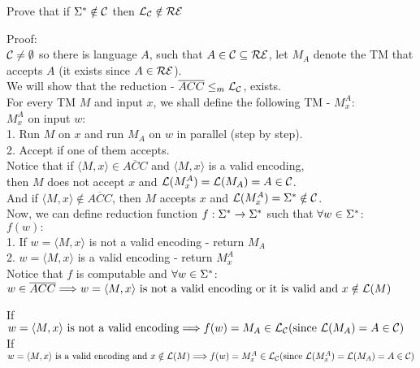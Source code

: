 Prove that if $\Sigma^* \notin \mathcal{C}$ then $\mathcal{L}_{\mathcal{C}} \notin \mathcal{R}\mathcal{E}$

Proof: \\
$\mathcal{C} \neq \emptyset$ so there is language $A$, such that $A \in \mathcal{C} \subseteq \mathcal{R}\mathcal{E}$,
let $M_A$ denote the TM that accepts $A$ (it exists since $A \in \mathcal{R}\mathcal{E}$). \\

We will show that the reduction - $\overline{ACC} \leq_m \mathcal{L}_{\mathcal{C}}$, exists. \\

For every TM $M$ and input $x$, we shall define the following TM - $M_x^A$: \\
$M_x^A$ on input $w$: \\
1. Run $M$ on $x$ and run $M_A$ on $w$ in parallel (step by step). \\
2. Accept if one of them accepts. \\

Notice that if $\langle M, x \rangle \in \overline{ACC}$ and $\langle M, x \rangle$ is a valid encoding, \\
then $M$ does not accept $x$ and $\mathcal{L}(M_x^A) = \mathcal{L}(M_A) = A \in \mathcal{C}$. \\
And if $\langle M, x \rangle \notin \overline{ACC}$,
then $M$ accepts $x$ and $\mathcal{L}(M_x^A) = \Sigma^* \notin \mathcal{C}$. \\

Now, we can define reduction function $f: \Sigma^* \rightarrow \Sigma^*$ such that $\forall w \in \Sigma^*$:\\
$f(w):$ \\
1. If $w = \langle M, x \rangle$ is not a valid encoding - return $M_A$ \\
2. $w = \langle M, x \rangle$ is a valid encoding - return $M_x^A$ \\

Notice that $f$ is computable and $\forall w \in \Sigma^*$: \\
$w \in \overline{ACC} \\
    \Longrightarrow w = \langle M, x \rangle \text{ is not a valid encoding or it is valid and } x \notin \mathcal{L}(M)$

If $w = \langle M, x \rangle \text{ is not a valid encoding}
    \Longrightarrow f(w) = M_A \in \mathcal{L}_{\mathcal{C}} (\text{since } \mathcal{L}(M_A) = A \in \mathcal{C})$ \\
If $w = \langle M, x \rangle \text{ is a valid encoding and } x \notin \mathcal{L}(M)
    \Longrightarrow f(w) = M_x^A \in \mathcal{L}_{\mathcal{C}} (\text{since } \mathcal{L}(M_x^A) = \mathcal{L}(M_A) = A \in \mathcal{C})$ \\

